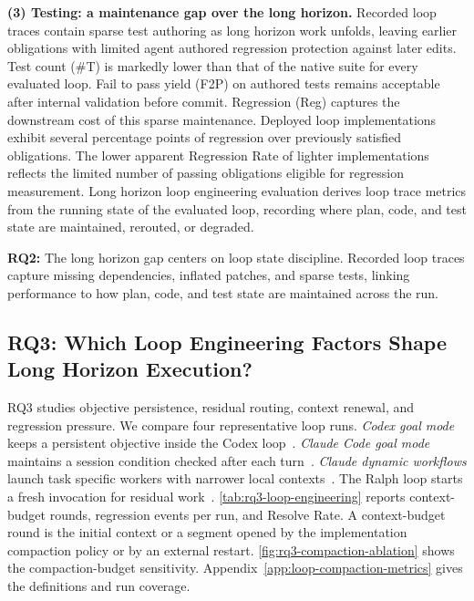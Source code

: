 \textbf{(3) Testing: a maintenance gap over the long horizon.}
Recorded loop traces contain sparse test authoring as long horizon work unfolds, leaving earlier obligations with limited agent authored regression protection against later edits.
Test count (\#T) is markedly lower than that of the native suite for every evaluated loop. Fail to pass yield (F2P) on authored tests remains acceptable after internal validation before commit. Regression (Reg) captures the downstream cost of this sparse maintenance.
Deployed loop implementations exhibit several percentage points of regression over previously satisfied obligations. The lower apparent Regression Rate of lighter implementations reflects the limited number of passing obligations eligible for regression measurement.
Long horizon loop engineering evaluation derives loop trace metrics from the running state of the evaluated loop, recording where plan, code, and test state are maintained, rerouted, or degraded.
\begin{summary}
\textbf{RQ2:} The long horizon gap centers on loop state discipline. Recorded loop traces capture missing dependencies, inflated patches, and sparse tests, linking performance to how plan, code, and test state are maintained across the run.
\end{summary}

\vspace{-3pt}
\subsection{RQ3: Which Loop Engineering Factors Shape Long Horizon Execution?}\label{sec:rq3}

RQ3 studies objective persistence, residual routing, context renewal, and regression pressure. We compare four representative loop runs. \emph{Codex goal mode} keeps a persistent objective inside the Codex loop~\citep{openai_codex_prompting}. \emph{Claude Code goal mode} maintains a session condition checked after each turn~\citep{anthropic_claude_code_goal}. \emph{Claude dynamic workflows} launch task specific workers with narrower local contexts~\citep{anthropic_claude_code_workflows,anthropic_claude_code_subagents}. The Ralph loop starts a fresh invocation for residual work~\citep{huntley_ralph_wiggum,huntley_ralph_loop}.
\autoref{tab:rq3-loop-engineering} reports context-budget rounds, regression events per run, and Resolve Rate. A context-budget round is the initial context or a segment opened by the implementation compaction policy or by an external restart. \autoref{fig:rq3-compaction-ablation} shows the compaction-budget sensitivity. Appendix~\ref{app:loop-compaction-metrics} gives the definitions and run coverage.

